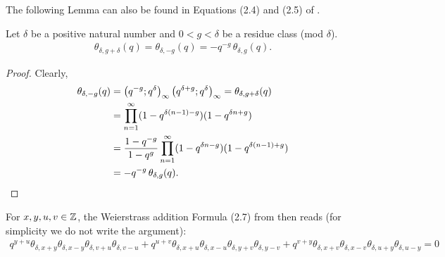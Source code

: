 \documentclass{article}
\begin{document}
\begin{Hemmecke}
The following Lemma can also be found in Equations (2.4) and (2.5) of
\cite{Koornwinder_ThetaIdentities_2014}.
\begin{Lemma}
  Let $\delta$ be a positive natural number and $0 < g < \delta$ be a
  residue class (mod $\delta$).
  \begin{gather}
    \theta_{\delta,g+\delta}(q)
      =
      \theta_{\delta,-g}(q)
      =
      -q^{-g} \, \theta_{\delta,g}(q).
      \label{eq:theta_delta-g}
  \end{gather}
\end{Lemma}
\begin{proof}
  Clearly,
  \begin{align*}
    \theta_{\delta,-g}(q)
    &=
      \left( q^{-g};q^\delta \right)_{\infty} \left( q^{\delta+g};q^\delta \right)_{\infty}
      =
      \theta_{\delta,g+\delta}(q)
    \\
    &=
      \prod_{n=1}^\infty (1-q^{\delta (n-1)-g})(1-q^{\delta n + g})
    \\
    &=
      \frac{1-q^{-g}}{1-q^g}
      \prod_{n=1}^\infty (1-q^{\delta n - g})(1-q^{\delta (n-1) + g})
    \\
    &=
      -q^{-g} \, \theta_{\delta,g}(q).
  \end{align*}
\end{proof}


For $x,y,u,v\in\mathbb{Z}$, the Weierstrass addition Formula (2.7) from
\cite{Koornwinder_ThetaIdentities_2014} then reads (for simplicity we
do not write the argument):
\begin{gather}
  q^{y+u} \theta_{\delta,x+y} \theta_{\delta,x-y}
  \theta_{\delta,v+u} \theta_{\delta,v-u}
  +
  q^{u+v} \theta_{\delta,x+u} \theta_{\delta,x-u}
  \theta_{\delta,y+v} \theta_{\delta,y-v}
  +
  q^{v+y} \theta_{\delta,x+v} \theta_{\delta,x-v}
  \theta_{\delta,u+y} \theta_{\delta,u-y}
  =
  0
\end{gather}

\end{Hemmecke}
\end{document}
